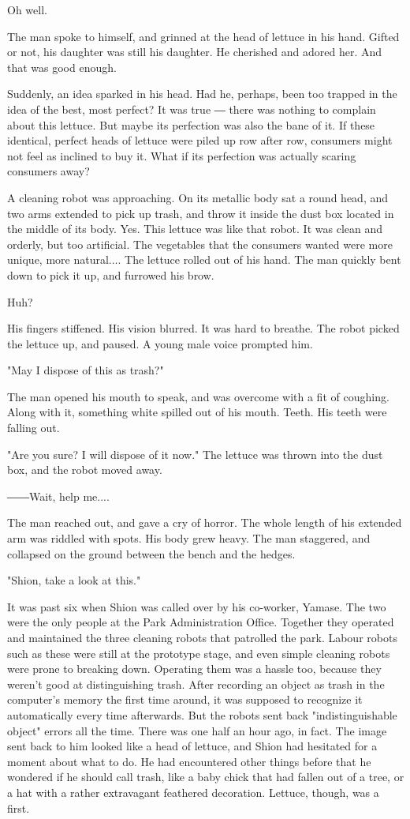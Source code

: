 Oh well.

The man spoke to himself, and grinned at the head of lettuce in his
hand. Gifted or not, his daughter was still his daughter. He cherished
and adored her. And that was good enough.

Suddenly, an idea sparked in his head. Had he, perhaps, been too trapped
in the idea of the best, most perfect? It was true ― there was nothing
to complain about this lettuce. But maybe its perfection was also the
bane of it. If these identical, perfect heads of lettuce were piled up
row after row, consumers might not feel as inclined to buy it. What if
its perfection was actually scaring consumers away?

A cleaning robot was approaching. On its metallic body sat a round head,
and two arms extended to pick up trash, and throw it inside the dust box
located in the middle of its body. Yes. This lettuce was like that
robot. It was clean and orderly, but too artificial. The vegetables that
the consumers wanted were more unique, more natural.... The lettuce
rolled out of his hand. The man quickly bent down to pick it up, and
furrowed his brow.

Huh?

His fingers stiffened. His vision blurred. It was hard to breathe. The
robot picked the lettuce up, and paused. A young male voice prompted
him.

"May I dispose of this as trash?"

The man opened his mouth to speak, and was overcome with a fit of
coughing. Along with it, something white spilled out of his mouth.
Teeth. His teeth were falling out.

"Are you sure? I will dispose of it now." The lettuce was thrown into
the dust box, and the robot moved away.

――Wait, help me....

The man reached out, and gave a cry of horror. The whole length of his
extended arm was riddled with spots. His body grew heavy. The man
staggered, and collapsed on the ground between the bench and the hedges.

"Shion, take a look at this."

It was past six when Shion was called over by his co-worker, Yamase. The
two were the only people at the Park Administration Office. Together
they operated and maintained the three cleaning robots that patrolled
the park. Labour robots such as these were still at the prototype stage,
and even simple cleaning robots were prone to breaking down. Operating
them was a hassle too, because they weren't good at distinguishing
trash. After recording an object as trash in the computer's memory the
first time around, it was supposed to recognize it automatically every
time afterwards. But the robots sent back "indistinguishable object"
errors all the time. There was one half an hour ago, in fact. The image
sent back to him looked like a head of lettuce, and Shion had hesitated
for a moment about what to do. He had encountered other things before
that he wondered if he should call trash, like a baby chick that had
fallen out of a tree, or a hat with a rather extravagant feathered
decoration. Lettuce, though, was a first.

